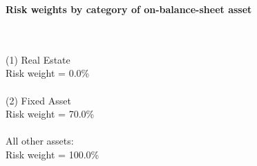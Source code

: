 \documentclass{article}
\begin{document}
\setlength{\parindent}{0em}
\begin{center}{\bf Risk weights by category of on-balance-sheet asset}\end{center}
~\\
~\\

(1) Real Estate\\
Risk weight = 0.0\%\\

~\\
(2) Fixed Asset\\
Risk weight = 70.0\%\\

~\\
All other assets:\\
Risk weight = 100.0\%\\

~\\
\end{document}
